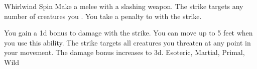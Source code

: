 \lowercase{\hypertarget{maneuver:Whirlwind Spin}{}}\label{maneuver:Whirlwind Spin}
\hypertarget{maneuver:Whirlwind Spin}{}
\begin{freeability}{Whirlwind Spin}
Make a melee  with a slashing weapon.
The strike targets any number of creatures you .
You take a  penalty to  with the strike.

\rankline
{} You gain a \plus1d bonus to damage with the strike.
 You can move up to 5 feet when you use this ability.
The strike targets all creatures you threaten at any point in your movement.
 The damage bonus increases to \plus3d.
 Esoteric, Martial, Primal, Wild
\end{freeability}
\vspace{0.25em}

